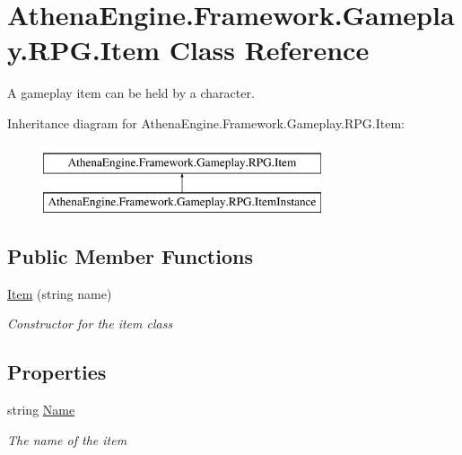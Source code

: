 \hypertarget{class_athena_engine_1_1_framework_1_1_gameplay_1_1_r_p_g_1_1_item}{\section{Athena\-Engine.\-Framework.\-Gameplay.\-R\-P\-G.\-Item Class Reference}
\label{class_athena_engine_1_1_framework_1_1_gameplay_1_1_r_p_g_1_1_item}
}


A gameplay item can be held by a character.  


Inheritance diagram for Athena\-Engine.\-Framework.\-Gameplay.\-R\-P\-G.\-Item\-:\begin{figure}[H]
\begin{center}
\leavevmode
\includegraphics[height=2.000000cm]{class_athena_engine_1_1_framework_1_1_gameplay_1_1_r_p_g_1_1_item}
\end{center}
\end{figure}
\subsection*{Public Member Functions}
\begin{DoxyCompactItemize}
\item 
\hyperlink{class_athena_engine_1_1_framework_1_1_gameplay_1_1_r_p_g_1_1_item_aa35e5cd5b28f10627a2a1b59bb2b1a2e}{Item} (string name)
\begin{DoxyCompactList}\small\item\em Constructor for the item class \end{DoxyCompactList}\end{DoxyCompactItemize}
\subsection*{Properties}
\begin{DoxyCompactItemize}
\item 
string \hyperlink{class_athena_engine_1_1_framework_1_1_gameplay_1_1_r_p_g_1_1_item_a136bbdfd9b142af4bea1980d66638242}{Name}
\begin{DoxyCompactList}\small\item\em The name of the item \end{DoxyCompactList}\end{DoxyCompactItemize}



